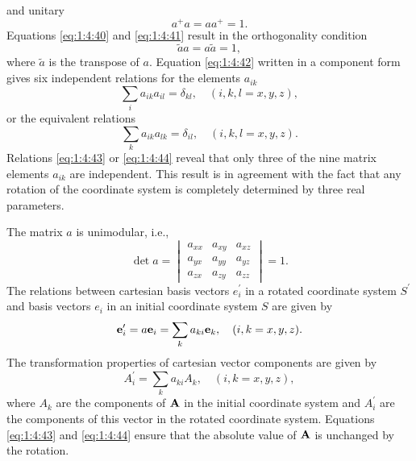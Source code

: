 and unitary
\begin{equation}
a^{+} a=a a^{+}=1. \label{eq:1:4:41}
\end{equation}
Equations \eqref{eq:1:4:40} and \eqref{eq:1:4:41} result in the orthogonality condition
\begin{equation}
\tilde{a} a=a \tilde{a}=1, \label{eq:1:4:42}
\end{equation}
where \(\tilde{a}\) is the transpose of \(a\). Equation \eqref{eq:1:4:42} written in a component form gives six independent relations for the elements \(a_{i k}\)
\begin{equation}
\sum_{i} a_{i k} a_{i l}=\delta_{k l}, \quad(i, k, l=x, y, z), \label{eq:1:4:43}
\end{equation}
or the equivalent relations
\begin{equation}
\sum_{k} a_{i k} a_{l k}=\delta_{i l}, \quad(i, k, l=x, y, z) . \label{eq:1:4:44}
\end{equation}
Relations \eqref{eq:1:4:43} or \eqref{eq:1:4:44} reveal that only three of the nine matrix elements \(a_{i k}\) are independent. This result is in agreement with the fact that any rotation of the coordinate system is completely determined by three real parameters.

The matrix \(a\) is unimodular, i.e.,
\begin{equation}
\det a=\begin{vmatrix}
a_{x x} & a_{x y} & a_{x z}  \label{eq:1:4:45}\\
a_{y x} & a_{y y} & a_{y z} \\
a_{z x} & a_{z y} & a_{z z}
\end{vmatrix}=1.
\end{equation}
The relations between cartesian basis vectors \(e_{i}^{\prime}\) in a rotated coordinate system \(S^{\prime}\) and basis vectors \(e_{i}\) in an initial coordinate system \(S\) are given by
\begin{equation}
\mathbf{e}_{i}^{\prime}=a \mathbf{e}_{i}=\sum_{k} a_{k i} \mathbf{e}_{k} , \quad(i, k=x, y, z) .\label{eq:1:4:46}
\end{equation}
The transformation properties of cartesian vector components are given by
\begin{equation}
A_{i}^{\prime}=\sum_{k} a_{k i} A_{k}, \quad(i, k=x, y, z), \label{eq:1:4:47}
\end{equation}
where \(A_{k}\) are the components of \(\mathbf{A}\) in the initial coordinate system and \(A_{i}^{\prime}\) are the components of this vector in the rotated coordinate system. Equations \eqref{eq:1:4:43} and \eqref{eq:1:4:44} ensure that the absolute value of \(\mathbf{A}\) is unchanged by the rotation.

